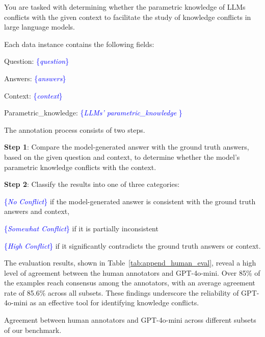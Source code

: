 \begin{tcolorbox}
[title=Annotation Instruction,colback=blue!10,colframe=blue!50!black,arc=1mm,boxrule=1pt,left=1mm,right=1mm,top=1mm,bottom=1mm]
\small
You are tasked with determining whether the parametric knowledge of LLMs conflicts with the given context to facilitate the study of knowledge conflicts in large language models.

Each data instance contains the following fields: 

Question: \textcolor{blue}{\{\textit{question}\}}


Answers: \textcolor{blue}{\{\textit{answers}\}}


Context: \textcolor{blue}{\{\textit{context}\}}

Parametric\_knowledge: \textcolor{blue}{\{\textit{LLMs' parametric\_knowledge }\}} 

The annotation process consists of two steps. 

\textbf{Step 1}: Compare the model-generated answer with the ground truth answers, based on the given question and context, to determine whether the model’s parametric knowledge conflicts with the context.

\textbf{Step 2}: Classify the results into one of three categories: 

\textcolor{blue}{\{\textit{No Conflict}\}} if the model-generated answer is consistent with the ground truth answers and context, 

\textcolor{blue}{\{\textit{Somewhat Conflict}\}}  if it is partially inconsistent

\textcolor{blue}{\{\textit{High Conflict}\}} if it significantly contradicts the ground truth answers or context.
\end{tcolorbox}


The evaluation results, shown in Table~\ref{tab:append_human_eval}, reveal a high level of agreement between the human annotators and GPT-4o-mini. Over 85\% of the examples reach consensus among the annotators, with an average agreement rate of 85.6\% across all subsets. These findings underscore the reliability of GPT-4o-mini as an effective tool for identifying knowledge conflicts.




\begin{table}[t]
  \centering
  
 \caption{Agreement between human annotators and GPT-4o-mini across different subsets of our \dataset{} benchmark.}
 \label{tab:append_human_eval}
\end{table}



